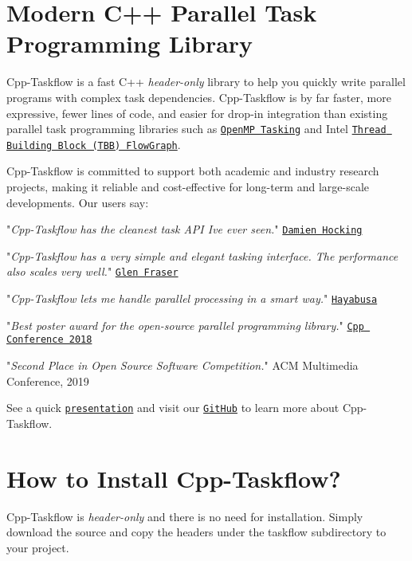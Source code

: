 \hypertarget{index_ModernCppParallelTaskProgrammingLibrary}{}\section{Modern C++ Parallel Task Programming Library}\label{index_ModernCppParallelTaskProgrammingLibrary}
Cpp-\/\+Taskflow is a fast C++ {\itshape header-\/only} library to help you quickly write parallel programs with complex task dependencies. Cpp-\/\+Taskflow is by far faster, more expressive, fewer lines of code, and easier for drop-\/in integration than existing parallel task programming libraries such as \href{http://www.nersc.gov/users/software/programming-models/openmp/openmp-tasking/}{\tt Open\+MP Tasking} and Intel \href{https://www.threadingbuildingblocks.org/tutorial-intel-tbb-flow-graph}{\tt Thread Building Block (T\+BB) Flow\+Graph}.



Cpp-\/\+Taskflow is committed to support both academic and industry research projects, making it reliable and cost-\/effective for long-\/term and large-\/scale developments. Our users say\+:

\begin{DoxyItemize}
\item "{\itshape Cpp-\/\+Taskflow has the cleanest task A\+PI I\textquotesingle{}ve ever seen.}" \href{https://github.com/damienhocking}{\tt Damien Hocking} \item "{\itshape Cpp-\/\+Taskflow has a very simple and elegant tasking interface. The performance also scales very well.}" \href{https://github.com/totalgee}{\tt Glen Fraser} \item "{\itshape Cpp-\/\+Taskflow lets me handle parallel processing in a smart way.}" \href{https://cpp-learning.com/cpp-taskflow/}{\tt Hayabusa} \item "{\itshape Best poster award for the open-\/source parallel programming library.}" \href{https://github.com/CppCon/CppCon2018}{\tt Cpp Conference 2018} \item "{\itshape Second Place in Open Source Software Competition.}" A\+CM Multimedia Conference, 2019\end{DoxyItemize}
See a quick \href{https://cpp-taskflow.github.io/}{\tt presentation} and visit our \href{https://github.com/cpp-taskflow/cpp-taskflow}{\tt Git\+Hub} to learn more about Cpp-\/\+Taskflow.\hypertarget{index_HowToInstallCppTaskflow}{}\section{How to Install Cpp-\/\+Taskflow?}\label{index_HowToInstallCppTaskflow}
Cpp-\/\+Taskflow is {\itshape header-\/only} and there is no need for installation. Simply download the source and copy the headers under the {\ttfamily taskflow} subdirectory to your project.


